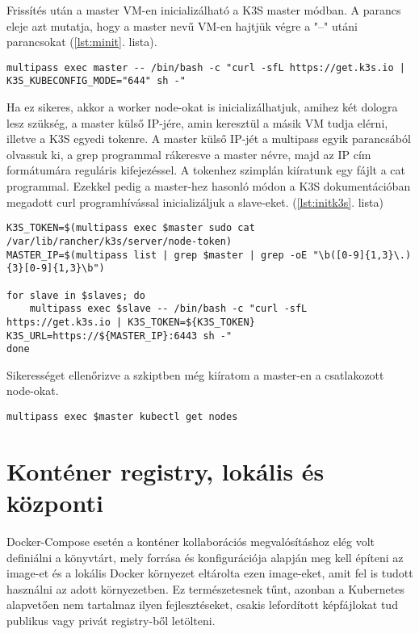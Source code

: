 \noindent
Frissítés után a master VM-en inicializálható a K3S master módban. A parancs eleje azt mutatja, hogy a master nevű VM-en hajtjük végre a "--" utáni parancsokat (\ref{lst:minit}. lista).
\begin{lstlisting}[caption={K3S Master inicializálása},label={lst:minit}]
multipass exec master -- /bin/bash -c "curl -sfL https://get.k3s.io | K3S_KUBECONFIG_MODE="644" sh -"
\end{lstlisting}
\noindent
Ha ez sikeres, akkor a worker node-okat is inicializálhatjuk, amihez két dologra lesz szükség, a master külső IP-jére, amin keresztül a másik VM tudja elérni, illetve a K3S egyedi tokenre. A master külső IP-jét a multipass egyik parancsából olvassuk ki, a grep programmal rákeresve a master névre, majd az IP cím formátumára reguláris kifejezéssel. A tokenhez szimplán kiíratunk egy fájlt a cat programmal. Ezekkel pedig a master-hez hasonló módon a K3S dokumentációban megadott curl programhívással inicializáljuk a slave-eket. (\ref{lst:initk3s}. lista)
\begin{lstlisting}[caption={K3S Slave-ek inicializálása},label={lst:initk3s}]
K3S_TOKEN=$(multipass exec $master sudo cat /var/lib/rancher/k3s/server/node-token)
MASTER_IP=$(multipass list | grep $master | grep -oE "\b([0-9]{1,3}\.){3}[0-9]{1,3}\b")

for slave in $slaves; do
	multipass exec $slave -- /bin/bash -c "curl -sfL https://get.k3s.io | K3S_TOKEN=${K3S_TOKEN} K3S_URL=https://${MASTER_IP}:6443 sh -"
done
\end{lstlisting}

\noindent
Sikerességet ellenőrizve a szkiptben még kiíratom a master-en a csatlakozott node-okat.
\begin{lstlisting}[caption={Node-ok lekérdezése}]
multipass exec $master kubectl get nodes
\end{lstlisting}

\section{Konténer registry, lokális és központi}
Docker-Compose esetén a konténer kollaborációs megvalósításhoz elég volt definiálni a könyvtárt, mely forrása és konfigurációja alapján meg kell építeni az image-et és a lokális Docker környezet eltárolta ezen image-eket, amit fel is tudott használni az adott környezetben. Ez természetesnek tűnt, azonban a Kubernetes alapvetően nem tartalmaz ilyen fejlesztéseket, csakis lefordított képfájlokat tud publikus vagy privát registry-ből letölteni.

